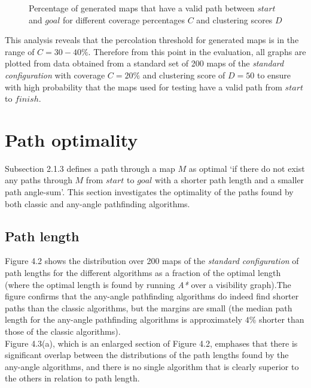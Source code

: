 \documentclass[12pt,notitlepage]{report}
\begin{document}
\begin{figure}
\centering

\caption[Percentage of generated maps that have a valid path between $start$ and $goal$]{Percentage of generated maps that have a valid path between $start$ and $goal$ for different coverage percentages $C$ and clustering scores $D$}
\end{figure}

\noindent
This analysis reveals that the percolation threshold for generated maps is in the range of $C=30-40\%$. Therefore from this point in the evaluation, all graphs are plotted from data obtained from a standard set of 200 maps of the {\em standard configuration} with coverage $C=20\%$ and clustering score of $D=50$ to ensure with high probability that the maps used for testing have a valid path from $start$ to $finish$.

\section{Path optimality}

Subsection 2.1.3 defines a path through a map $M$ as optimal `if there do not exist any paths through $M$ from $start$ to $goal$ with a shorter path length and a smaller path angle-sum'. This section investigates the optimality of the paths found by both classic and any-angle pathfinding algorithms.\\

\subsection{Path length}
Figure 4.2 shows the distribution over 200 maps of the {\em standard configuration} of path lengths for the different algorithms  as a fraction of the optimal length (where the optimal length is found by running {\em A*} over a visibility graph).The figure confirms that the any-angle pathfinding algorithms do indeed find shorter paths than the classic algorithms, but the margins are small (the median path length for the any-angle pathfinding algorithms is approximately $4\%$ shorter than those of the classic algorithms).\\

\noindent
Figure 4.3(a), which is an enlarged section of Figure 4.2, emphases that there is significant overlap between the distributions of the path lengths found by the any-angle algorithms, and there is no single algorithm that is clearly superior to the others in relation to path length.\\
\end{document}
